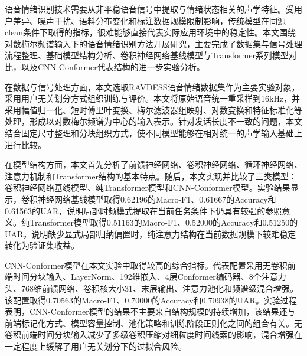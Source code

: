 %
%
%
%
%
%

\begin{conclusion}
语音情绪识别技术需要从非平稳语音信号中提取与情绪状态相关的声学特征。受用户差异、噪声干扰、语料分布变化和标注数据规模限制影响，传统模型在同源clean条件下取得的指标，很难能够直接代表实际应用环境中的稳定性。本文围绕对数梅尔频谱输入下的语音情绪识别方法开展研究，主要完成了数据集与信号处理流程整理、基础模型结构分析、卷积神经网络基线模型与Transformer系列模型对比，以及CNN-Conformer代表结构的进一步实验分析。

在数据与信号处理方面，本文选取RAVDESS语音情绪数据集作为主要实验对象，采用用户无关划分方式组织训练与评价。本文将原始语音统一重采样到16kHz，并采用幅值归一化、短时傅里叶变换、梅尔滤波器组映射、对数变换和特征标准化等处理，形成以对数梅尔频谱为中心的输入表示。针对发话长度不一致的问题，本文结合固定尺寸整理和分块组织方式，使不同模型能够在相对统一的声学输入基础上进行比较。

在模型结构方面，本文首先分析了前馈神经网络、卷积神经网络、循环神经网络、注意力机制和Transformer结构的基本特点。随后，本文实现并比较了三类模型：卷积神经网络基线模型、纯Transformer模型和CNN-Conformer模型。实验结果显示，卷积神经网络基线模型取得0.62196的Macro-F1、0.61667的Accuracy和0.61563的UAR，说明局部时频模式提取在当前任务条件下仍具有较强的参照意义。纯Transformer模型取得0.51163的Macro-F1、0.52000的Accuracy和0.51250的UAR，说明缺少显式局部归纳偏置时，纯注意力结构在当前数据规模下较难稳定转化为验证集收益。

CNN-Conformer模型在本文实验中取得较高的综合指标。代表配置采用无卷积前端时间分块输入、LayerNorm、192维嵌入、4层Conformer编码器、8个注意力头、768维前馈网络、卷积核大小31、末层输出、注意力池化和频谱级混合增强。该配置取得0.70563的Macro-F1、0.70000的Accuracy和0.70938的UAR。实验过程表明，CNN-Conformer模型的结果不主要来自结构规模的持续增加，该结果还与前端标记化方式、模型容量控制、池化策略和训练阶段正则化之间的组合有关。无卷积前端时间分块输入减少了多级卷积压缩对细粒度时间线索的影响，混合增强在一定程度上缓解了用户无关划分下的过拟合风险。


\end{conclusion}
